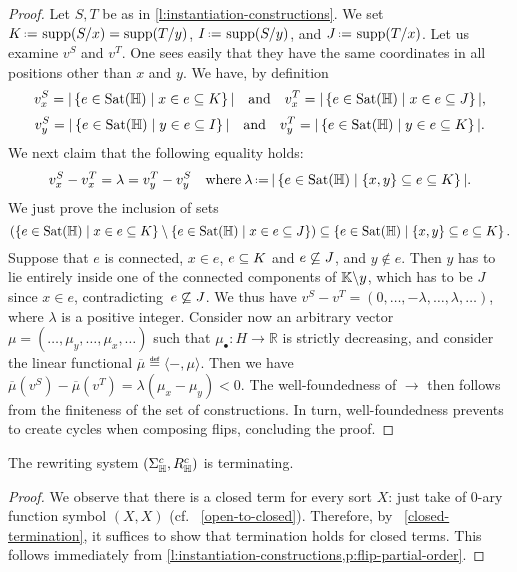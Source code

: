 \begin{proof}
Let $S,T$ be as in \cref{l:instantiation-constructions}. 
We set $K\eqdef \supp(\occ{S}{x})=\supp(\occ{T}{y})$, $I\eqdef \supp(\occ{S}{y})$, and $J\eqdef \supp(\occ{T}{x})$.
Let us examine $v^S$ and $v^T$. 
One sees easily that they have the same coordinates in all positions other than $x$ and $y$. 
We have, by definition
$$ v^S_x  = |\left\{e\in{\operatorname{Sat}}({\mathbb H}) \mid x\in e\subseteq K\right\}| \quad \text{and} \quad v^T_x  = |\left\{e\in{\operatorname{Sat}}({\mathbb H}) \mid x\in e\subseteq J\right\}|, $$
$$ v^S_y  = |\left\{e\in{\operatorname{Sat}}({\mathbb H}) \mid y\in e\subseteq I\right\}| \quad \text{and} \quad v^T_y  = |\left\{e\in{\operatorname{Sat}}({\mathbb H}) \mid y\in e\subseteq K\right\}|.$$
We next claim that the following equality holds:
$$v^S_x  - v^T_x  = \lambda = 
v^T_y - v^S_y \quad\textrm{where}\: \lambda\eqdef  |\setc{e\in{\Sat}(\hyper{H})}{\set{x,y}\inc e\inc K}|.$$
We just prove the inclusion of sets
$$\left(\left\{e\in{\operatorname{Sat}}({\mathbb H}) \mid x\in e\subseteq K\right\}\setminus\left\{e\in{\operatorname{Sat}}({\mathbb H}) \mid x\in e\subseteq J\right\}\right)
\subseteq\left\{e\in{\operatorname{Sat}}({\mathbb H}) \mid \left\{x,y\right\}\subseteq e\subseteq K\right\}.$$
Suppose that $e$ is connected, $x\in e$, $e\subseteq K$ and $e\not\subseteq J$, and $y\not\in e$. Then $y$ has to lie entirely inside one of the connected components of ${\mathbb K}\backslash y$, which has to be $J$ since $x\in e$, contradicting~$e\not\subseteq J$.
We thus have
$v^S - v^T = (0,\ldots,-\lambda,\ldots,\lambda,\ldots)$, where $\lambda$ is a positive integer.
Consider now an arbitrary vector $\mu=(\ldots,\mu_y,\ldots,\mu_x,\ldots)$ such that $\mu_{\bullet}:H\rightarrow\mathbb{R}$ is strictly decreasing, and consider the linear functional $\overline{\mu}\eqdef \langle -,\mu\rangle$. 
Then we have 
$\overline{\mu}(v^S)- \overline{\mu}(v^T)=\lambda(\mu_x-\mu_y)<0$.  The well-foundedness of $\to$ then follows from the finiteness of the set of constructions. In turn, well-foundedness 
prevents to create cycles when composing flips, concluding the proof.
\end{proof}


\begin{thm}
  \label{thm:termination}
  The rewriting system $(\Sigma_{\mathbb H}^c,R_{\mathbb H}^c)$ is terminating.
\end{thm}

\begin{proof} 
  We observe that there is a closed term for every sort $X$: just take of 0-ary function symbol $(X,X)$ (cf.~ \cref{open-to-closed}). 
  Therefore, by~ \cref{closed-termination}, it suffices to show that termination holds for closed terms. 
  This follows immediately from \cref{l:instantiation-constructions,p:flip-partial-order}.
\end{proof}

